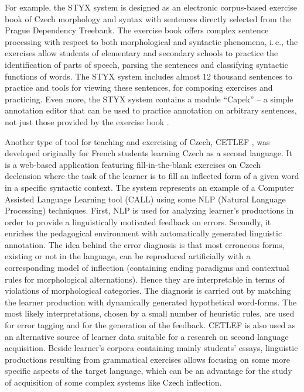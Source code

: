 \begin{multicols}{2}
For example, the STYX system is designed as an electronic corpus-based exercise book of Czech morphology and syntax with sentences directly selected from the Prague Dependency Treebank. The exercise book offers complex sentence processing with respect to both morphological and syntactic phenomena, i.\,e., the exercises allow students of elementary and secondary schools to practice the identification of parts of speech, parsing the sentences and classifying syntactic functions of words. The STYX system includes almost 12 thousand sentences to practice and tools for viewing these sentences, for composing exercises and practicing. Even more, the STYX system contains a module “Capek” -- a simple annotation editor that can be used to practice annotation on arbitrary sentences, not just those provided by the exercise book \cite{Note8}.

Another type of tool for teaching and exercising of Czech, CETLEF \cite{Note9}, was developed originally for French students learning Czech as a second language. It is a web-based application featuring fill-in-the-blank exercises on Czech declension where the task of the learner is to fill an inflected form of a given word in a specific syntactic context. The system represents an example of a Computer Assisted Language Learning tool (CALL) using some NLP (Natural Language Processing) techniques. First, NLP is used for analyzing learner’s productions in order to provide a linguistically motivated feedback on errors. Secondly, it enriches the pedagogical environment with automatically generated linguistic annotation. The idea behind the error diagnosis is that most erroneous forms, existing or not in the language, can be reproduced artificially with a corresponding model of inflection (containing ending paradigms and contextual rules for morphological alternations). Hence they are interpretable in terms of violations of morphological categories. The diagnosis is carried out by matching the learner production with dynamically generated hypothetical word-forms. The most likely interpretations, chosen by a small number of heuristic rules, are used for error tagging and for the generation of the feedback. CETLEF is also used as an alternative source of learner data suitable for a research on second language acquisition. Beside learner’s corpora containing mainly students’ essays, linguistic productions resulting from grammatical exercises allows focusing on some more specific aspects of the target language, which can be an advantage for the study of acquisition of some complex systems like Czech inflection.


\end{multicols}
